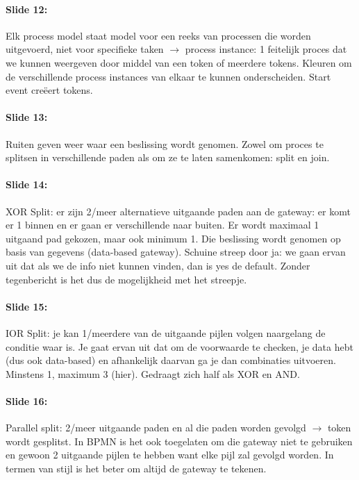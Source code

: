 \documentclass[10pt,a4paper]{report}
\begin{document}
\paragraph{Slide 12:}Elk process model staat model voor een reeks van processen die worden uitgevoerd, niet voor specifieke taken $\rightarrow$ process instance: 1 feitelijk proces dat we kunnen weergeven door middel van een token of meerdere tokens. Kleuren om de verschillende process instances van elkaar te kunnen onderscheiden.
Start event creëert tokens.

\paragraph{Slide 13:}Ruiten geven weer waar een beslissing wordt genomen. Zowel om proces te splitsen in verschillende paden als om ze te laten samenkomen: split en join.

\paragraph{Slide 14:} XOR Split: er zijn 2/meer alternatieve uitgaande paden aan de gateway: er komt er 1 binnen en er gaan er verschillende naar buiten. Er wordt maximaal 1 uitgaand pad gekozen, maar ook minimum 1. Die beslissing wordt genomen op basis van gegevens (data-based gateway). Schuine streep door ja: we gaan ervan uit dat als we de info niet kunnen vinden, dan is yes de default. Zonder tegenbericht is het dus de mogelijkheid met het streepje.

\paragraph{Slide 15:}IOR Split: je kan 1/meerdere van de uitgaande pijlen volgen naargelang de conditie waar is. Je gaat ervan uit dat om de voorwaarde te checken, je data hebt (dus ook data-based) en afhankelijk daarvan ga je dan combinaties uitvoeren. Minstens 1, maximum 3 (hier). Gedraagt zich half als XOR en AND.

\paragraph{Slide 16:}Parallel split: 2/meer uitgaande paden en al die paden worden gevolgd $\rightarrow$ token wordt gesplitst. In BPMN is het ook toegelaten om die gateway niet te gebruiken en gewoon 2 uitgaande pijlen te hebben want elke pijl zal gevolgd worden. In termen van stijl is het beter om altijd de gateway te tekenen.
\end{document}
